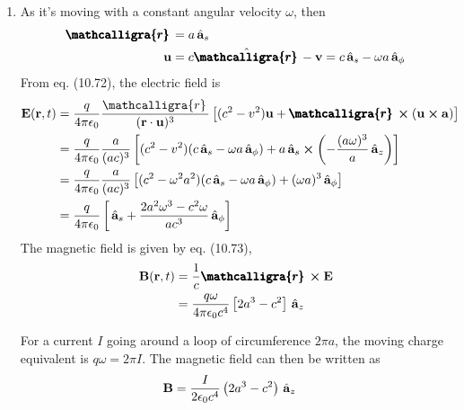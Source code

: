 \documentclass{homework}
\newcommand{\scriptr}{\mathcalligra{r}\,}
\newcommand{\boldscriptr}{\pmb{\mathcalligra{r}}\,}
\begin{document}
\begin{enumerate}
		\item As it's moving with a constant angular velocity $\omega$, then \begin{align*}
			\boldscriptr & = a \uvec{s} \\
			\bvec{u} & = c \hat{\boldscriptr} - \bvec{v} = c \uvec{s} - \omega a \uvec{\phi} 
		\end{align*}
		From eq. (10.72), the electric field is \begin{align*}
			\bvec{E}(\bvec{r}, t) & = \frac{q}{4 \pi \epsilon_0} \frac{\scriptr}{(\bvec{r} \cdot \bvec{u})^3} \left[
				(c^2 - v^2) \bvec{u} + \boldscriptr \cross (\bvec{u} \cross \bvec{a}) 
			\right] \\
				& = \frac{q}{4 \pi \epsilon_0} \frac{a}{(ac)^3} \left[
					(c^2 - v^2) (c \uvec{s} - \omega a \uvec{\phi})
					+ a \uvec{s} \cross \left(-\frac{(a \omega)^3}{a} \uvec{z}\right)
				\right] \\
				& = \frac{q}{4 \pi \epsilon_0} \frac{a}{(ac)^3} \left[
				(c^2 - \omega^2 a^2) (c \uvec{s} - \omega a \uvec{\phi})
				+ (\omega a)^3 \uvec{\phi}
				\right] \\
				& = \frac{q}{4 \pi \epsilon_0} \left[
					\uvec{s}
					+
					\frac{2a^2 \omega^3 - c^2 \omega}{ac^3} \uvec{\phi}
				\right]
		\end{align*}
		The magnetic field is given by eq. (10.73), \begin{align*}
			\bvec{B}(\bvec{r}, t) & = \frac{1}{c} \boldscriptr \cross \bvec{E} \\
				& = \frac{q \omega }{4 \pi \epsilon_0 c^4} \left[ 2a^3 - c^2 \right] \uvec{z}
		\end{align*}
	
		For a current $I$ going around a loop of circumference $2 \pi a$, the moving charge equivalent is $q\omega = 2 \pi I$. The magnetic field can then be written as \begin{align*}
			\boldsymbol{\mathrm{B}} & = \frac{I}{2 \epsilon_0 c^4} \left(2 a^3 - c^2\right) \thinspace\hat{ \mathbf{a}}_{z}
		\end{align*}
		
	\end{enumerate}
\end{document}
